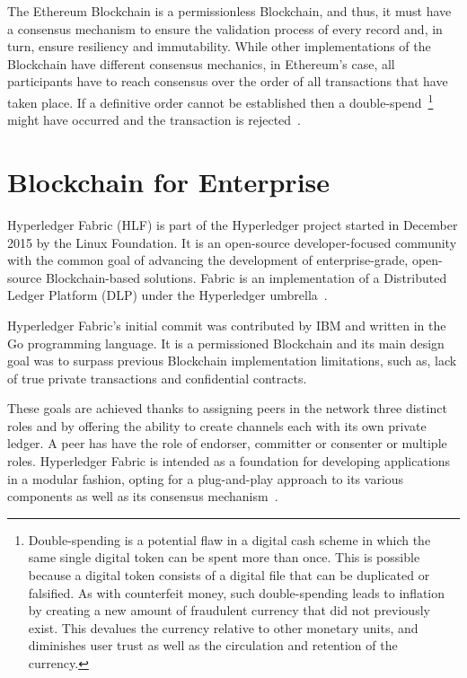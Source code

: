 The Ethereum Blockchain is a permissionless Blockchain, and thus, it must have
a consensus mechanism to ensure the validation process of every record and, in
turn, ensure resiliency and immutability. While other implementations of the
Blockchain have different consensus mechanics, in Ethereum’s case, all
participants have to reach consensus over the order of all transactions that
have taken place. If a definitive order cannot be established then a
double-spend~\footnote{Double-spending is a potential flaw in a digital cash
scheme in which the same single digital token can be spent more than once.
This is possible because a digital token consists of a digital file that can be
duplicated or falsified. As with counterfeit money, such double-spending leads
to inflation by creating a new amount of fraudulent currency that did not
previously exist. This devalues the currency relative to other monetary units,
and diminishes user trust as well as the circulation and retention of the
currency.} might have occurred and the transaction is rejected~\cite{Wood2017}.

\section{Blockchain for Enterprise} \label{enterpriseBlockchain}

Hyperledger Fabric (HLF) is part of the Hyperledger project started in December
2015 by the Linux Foundation. It is an open-source developer-focused community
with the common goal of advancing the development of enterprise-grade,
open-source Blockchain-based solutions.  Fabric is an implementation of a
Distributed Ledger Platform (DLP) under the Hyperledger
umbrella~\cite{Cachin2016}.

Hyperledger Fabric’s initial commit was contributed by IBM and written in the
Go programming language.  It is a permissioned Blockchain and its main design
goal was to surpass previous Blockchain implementation limitations, such as,
lack of true private transactions and confidential contracts.

These goals are achieved thanks to assigning peers in the network three
distinct roles and by offering the ability to create channels each with its own
private ledger.  A peer has have the role of endorser, committer or consenter
or multiple roles.  Hyperledger Fabric is intended as a foundation for
developing applications in a modular fashion, opting for a plug-and-play
approach to its various components as well as its consensus
mechanism~\cite{HyperledgerFabricDocs2017}.

